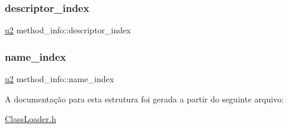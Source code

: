\subsubsection{\texorpdfstring{descriptor\+\_\+index}{descriptor\_index}}
{\footnotesize\ttfamily \hyperlink{ClassLoader_8h_a5f223212eef04d10a4550ded680cb1cf}{u2} method\+\_\+info\+::descriptor\+\_\+index}

\mbox{\label{structmethod__info_ab91d62d0658b77bba83f6bb685e3bbb9}} 
\subsubsection{\texorpdfstring{name\+\_\+index}{name\_index}}
{\footnotesize\ttfamily \hyperlink{ClassLoader_8h_a5f223212eef04d10a4550ded680cb1cf}{u2} method\+\_\+info\+::name\+\_\+index}



A documentação para esta estrutura foi gerada a partir do seguinte arquivo\+:\begin{DoxyCompactItemize}
\item 
\hyperlink{ClassLoader_8h}{Class\+Loader.\+h}\end{DoxyCompactItemize}
